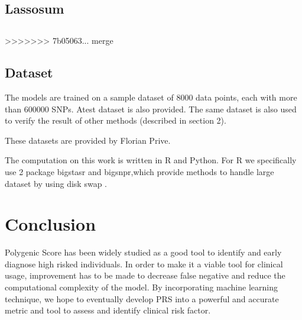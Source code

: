 \documentclass{article}
\begin{document}
\subsection{Lassosum}
\subsection{}

>>>>>>> 7b05063... merge

\subsection{Dataset}

The models are trained on a sample dataset of 8000 data points, each with more than 
$600000$ SNPs. Atest dataset is also provided. The same dataset is also used to verify 
the result of other methods (described in section 2).

These datasets are provided by Florian Prive.

The computation on this work is written in R and Python. For R we specifically use 2 
package bigstasr and bigsnpr,which provide methods to handle large dataset by using disk 
swap \cite{bigsnpr}.

\section{Conclusion}

Polygenic Score has been widely studied as a good tool to identify and early
diagnose high risked individuals. In order to make it a viable tool for clinical usage,
improvement has to be made to decrease false negative and reduce the computational
complexity of the model. By incorporating machine learning technique, we hope to
eventually develop PRS into a powerful and accurate metric and tool to assess
and identify clinical risk factor.



\end{document}

